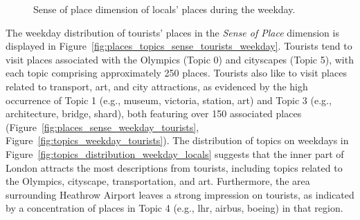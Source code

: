 \documentclass{article}
\theoremstyle{remark}
\begin{document}
\begin{figure}[!h]
    \caption{Sense of place dimension of locals' places during the weekday.}
    \label{fig:places_topics_sense_locals_weekday}
\end{figure}

The weekday distribution of tourists' places in the \textit{Sense of Place} dimension is displayed in Figure~\ref{fig:places_topics_sense_tourists_weekday}. Tourists tend to visit places associated with the Olympics (Topic 0) and cityscapes (Topic 5), with each topic comprising approximately 250 places. Tourists also like to visit places related to transport, art, and city attractions, as evidenced by the high occurrence of Topic 1 (e.g., museum, victoria, station, art) and Topic 3 (e.g., architecture, bridge, shard), both featuring over 150 associated places (Figure~\ref{fig:places_sense_weekday_tourists}, Figure~\ref{fig:topics_weekday_tourists}). The distribution of topics on weekdays in Figure~\ref{fig:topics_distribution_weekday_locals} suggests that the inner part of London attracts the most descriptions from tourists, including topics related to the Olympics, cityscape, transportation, and art. Furthermore, the area surrounding Heathrow Airport leaves a strong impression on tourists, as indicated by a concentration of places in Topic 4 (e.g., lhr, airbus, boeing) in that region.
\end{document}
